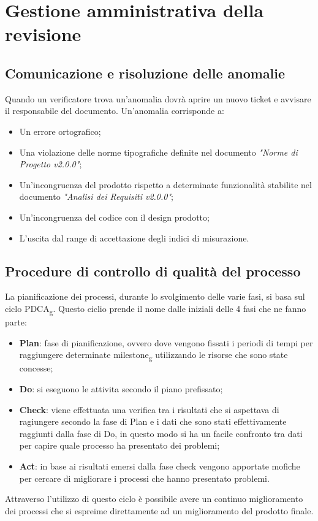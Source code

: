 \documentclass[12pt,a4paper,titlepage]{article}
\begin{document}
	\newpage
	\section{Gestione amministrativa della revisione}
		\subsection{Comunicazione e risoluzione delle anomalie}
		Quando un verificatore trova un'anomalia dovrà aprire un nuovo ticket e avvisare il responsabile del documento. Un'anomalia corrisponde a:
		\begin{itemize}
			\item Un errore ortografico;
			\item Una violazione delle norme tipografiche definite nel documento \textit{"Norme di Progetto v2.0.0"}; 
			\item Un'incongruenza del prodotto rispetto a determinate funzionalità stabilite nel documento \textit{"Analisi dei Requisiti v2.0.0"};
			\item Un'incongruenza del codice con il design prodotto;
			\item L'uscita dal range di accettazione degli indici di misurazione.
		\end{itemize}
		
		\subsection{Procedure di controllo di qualità del processo}
		La pianificazione dei processi, durante lo svolgimento delle varie fasi, si basa sul ciclo PDCA\textsubscript{g}. Questo ciclio prende il nome dalle iniziali delle 4 fasi che ne fanno parte:
		\begin{itemize}
		    \item \textbf{Plan}: fase di pianificazione, ovvero dove vengono fissati i periodi di tempi per raggiungere determinate milestone\textsubscript{g} utilizzando le risorse che sono state concesse; 
		    \item \textbf{Do}: si eseguono le attivita secondo il piano prefissato;
		    \item \textbf{Check}: viene effettuata una verifica tra i risultati che si aspettava di ragiungere secondo la fase di Plan e i dati che sono stati effettivamente raggiunti dalla fase di Do, in questo modo si ha un facile confronto tra dati per capire quale processo ha presentato dei problemi;
		    \item \textbf{Act}: in base ai risultati emersi dalla fase check vengono apportate mofiche per cercare di migliorare i processi che hanno presentato problemi.
		\end{itemize}
	    Attraverso l'utilizzo di questo ciclo è possibile avere un continuo miglioramento dei processi che si espreime direttamente ad un miglioramento del prodotto finale.
	
\end{document}
